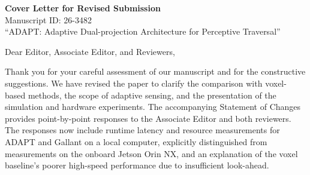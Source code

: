 \documentclass[11pt]{article}
\begin{document}
\begin{center}
{\LARGE\bfseries Cover Letter for Revised Submission}\\[0.8em]
{\large Manuscript ID: 26-3482}\\[0.35em]
{\large ``ADAPT: Adaptive Dual-projection Architecture for Perceptive Traversal''}
\end{center}

\vspace{0.8em}

Dear Editor, Associate Editor, and Reviewers,

Thank you for your careful assessment of our manuscript and for the constructive suggestions. We have revised the paper to clarify the comparison with voxel-based methods, the scope of adaptive sensing, and the presentation of the simulation and hardware experiments. The accompanying Statement of Changes provides point-by-point responses to the Associate Editor and both reviewers. The responses now include runtime latency and resource measurements for ADAPT and Gallant on a local computer, explicitly distinguished from measurements on the onboard Jetson Orin NX, and an explanation of the voxel baseline's poorer high-speed performance due to insufficient look-ahead.
\end{document}
